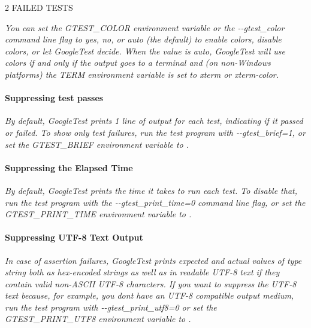 {\itshape 
\begin{DoxyPre} 2 FAILED TESTS
\end{DoxyPre}
}

{\itshape You can set the {\ttfamily G\+T\+E\+S\+T\+\_\+\+C\+O\+L\+OR} environment variable or the {\ttfamily -\/-\/gtest\+\_\+color} command line flag to {\ttfamily yes}, {\ttfamily no}, or {\ttfamily auto} (the default) to enable colors, disable colors, or let Google\+Test decide. When the value is {\ttfamily auto}, Google\+Test will use colors if and only if the output goes to a terminal and (on non-\/\+Windows platforms) the {\ttfamily T\+E\+RM} environment variable is set to {\ttfamily xterm} or {\ttfamily xterm-\/color}.}

{\itshape \paragraph*{Suppressing test passes}}

{\itshape }

{\itshape By default, Google\+Test prints 1 line of output for each test, indicating if it passed or failed. To show only test failures, run the test program with {\ttfamily -\/-\/gtest\+\_\+brief=1}, or set the G\+T\+E\+S\+T\+\_\+\+B\+R\+I\+EF environment variable to {}.}

{\itshape \paragraph*{Suppressing the Elapsed Time}}

{\itshape }

{\itshape By default, Google\+Test prints the time it takes to run each test. To disable that, run the test program with the {\ttfamily -\/-\/gtest\+\_\+print\+\_\+time=0} command line flag, or set the G\+T\+E\+S\+T\+\_\+\+P\+R\+I\+N\+T\+\_\+\+T\+I\+ME environment variable to {}.}

{\itshape \paragraph*{Suppressing U\+T\+F-\/8 Text Output}}

{\itshape }

{\itshape In case of assertion failures, Google\+Test prints expected and actual values of type {\ttfamily string} both as hex-\/encoded strings as well as in readable U\+T\+F-\/8 text if they contain valid non-\/\+A\+S\+C\+II U\+T\+F-\/8 characters. If you want to suppress the U\+T\+F-\/8 text because, for example, you don\textquotesingle{}t have an U\+T\+F-\/8 compatible output medium, run the test program with {\ttfamily -\/-\/gtest\+\_\+print\+\_\+utf8=0} or set the {\ttfamily G\+T\+E\+S\+T\+\_\+\+P\+R\+I\+N\+T\+\_\+\+U\+T\+F8} environment variable to {}.}

